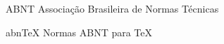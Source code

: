 \begin{siglas}
  \item[ABNT] Associação Brasileira de Normas Técnicas
  \item[abnTeX] Normas ABNT para TeX
\end{siglas}
